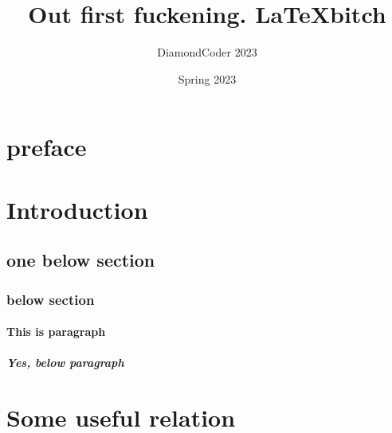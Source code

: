 \documentclass{article}
\title{Out first fuckening. \LaTeX bitch}
\author{DiamondCoder 2023}
\date{Spring 2023}
\begin{document}
\setcounter{tocdepth}{2}
\setcounter{secnumdepth}{4}

\maketitle

\tableofcontents %
\section*{preface}
\section{Introduction}
\subsection{one below section}
\subsubsection{below section}
\paragraph{This is paragraph}
\subparagraph{Yes, below paragraph}
%

%
%
\appendix
\section{Some useful relation}
\end{document}
